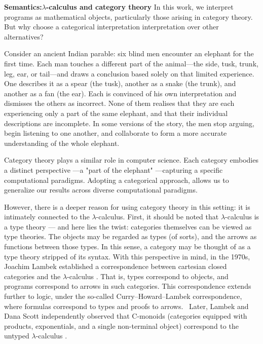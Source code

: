 

\noindent \textbf{Semantics:$\lambda$-calculus and category theory} In this work, we interpret programs as mathematical objects, particularly those arising in category theory. But why choose a categorical interpretation interpretation over other alternatives?

Consider an ancient Indian parable: six blind men encounter an elephant for the first time. Each man touches a different part of the animal—the side, tusk, trunk, leg, ear, or tail—and draws a conclusion based solely on that limited experience. One describes it as a spear (the tusk), another as a snake (the trunk), and another as a fan (the ear). Each is convinced of his own interpretation and dismisses the others as incorrect. None of them realises that they are each experiencing only a part of the same elephant, and that their individual descriptions are incomplete. In some versions of the story, the men stop arguing, begin listening to one another, and collaborate to form a more accurate understanding of the whole elephant. 

Category theory plays a similar role in computer science. Each category embodies a distinct perspective ---a "part of the elephant" ---capturing a specific computational paradigms. Adopting a categorical approach, allows us to generalize our results across diverse computational paradigms.


However, there is a deeper reason for using category theory in this setting: it is intimately connected to the $\lambda$-calculus. First, it should be noted that $\lambda$-calculus is a type theory --- and here lies the twist: categories themselves can be viewed as type theories. The objects may be regarded as types (of sorts), and the arrows as functions between those types. In this sense, a category may be thought of as a type theory stripped of its syntax. With this perspective in mind, in the 1970s, Joachim Lambek established a correspondence between cartesian closed categories and the $\lambda$-calculus \cite{lambek1980lambda}. That is, types correspond to objects, and programs correspond to arrows in such categories. This correspondence extends further to logic, under the so-called Curry–Howard–Lambek correspondence, where formulas correspond to types and proofs to arrows.  Later, Lambek and Dana Scott independently observed that C-monoids (\ie categories equipped with products, exponentials, and a single non-terminal object) correspond to the untyped $\lambda$-calculus \cite{lambekscott988}.





